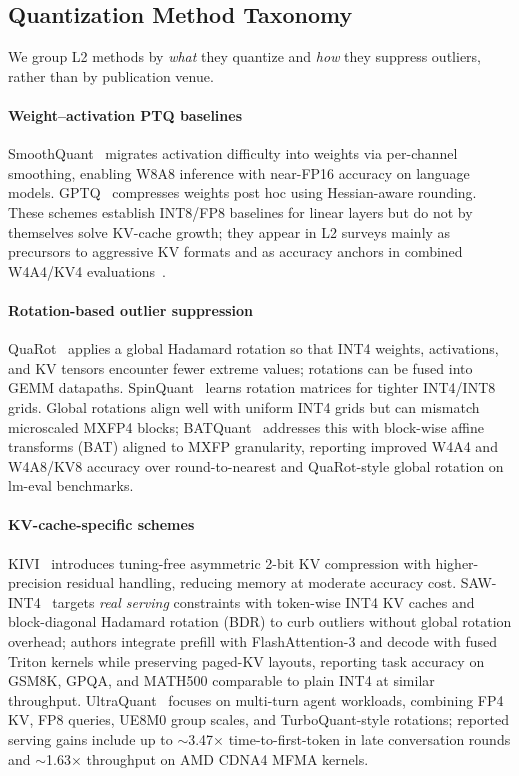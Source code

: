 \documentclass[conference]{IEEEtran}
\begin{document}
\subsection{Quantization Method Taxonomy}
\label{sec:l2-taxonomy}

We group L2 methods by \emph{what} they quantize and \emph{how} they suppress outliers, rather than by publication venue.

\paragraph{Weight--activation PTQ baselines}
SmoothQuant~\cite{xiao2023smoothquant} migrates activation difficulty into weights via per-channel smoothing, enabling W8A8 inference with near-FP16 accuracy on language models.
GPTQ~\cite{frantar2023gptq} compresses weights post hoc using Hessian-aware rounding.
These schemes establish INT8/FP8 baselines for linear layers but do not by themselves solve KV-cache growth; they appear in L2 surveys mainly as precursors to aggressive KV formats and as accuracy anchors in combined W4A4/KV4 evaluations~\cite{batquant2026}.

\paragraph{Rotation-based outlier suppression}
QuaRot~\cite{ashkboos2024quarot} applies a global Hadamard rotation so that INT4 weights, activations, and KV tensors encounter fewer extreme values; rotations can be fused into GEMM datapaths.
SpinQuant~\cite{liu2024spinquant} learns rotation matrices for tighter INT4/INT8 grids.
Global rotations align well with uniform INT4 grids but can mismatch microscaled MXFP4 blocks; BATQuant~\cite{batquant2026} addresses this with block-wise affine transforms (BAT) aligned to MXFP granularity, reporting improved W4A4 and W4A8/KV8 accuracy over round-to-nearest and QuaRot-style global rotation on lm-eval benchmarks.

\paragraph{KV-cache-specific schemes}
KIVI~\cite{liu2024kivi} introduces tuning-free asymmetric 2-bit KV compression with higher-precision residual handling, reducing memory at moderate accuracy cost.
SAW-INT4~\cite{sawint42026} targets \emph{real serving} constraints with token-wise INT4 KV caches and block-diagonal Hadamard rotation (BDR) to curb outliers without global rotation overhead; authors integrate prefill with FlashAttention-3 and decode with fused Triton kernels while preserving paged-KV layouts, reporting task accuracy on GSM8K, GPQA, and MATH500 comparable to plain INT4 at similar throughput.
UltraQuant~\cite{ultraquant2026} focuses on multi-turn agent workloads, combining FP4 KV, FP8 queries, UE8M0 group scales, and TurboQuant-style rotations; reported serving gains include up to $\sim$3.47$\times$ time-to-first-token in late conversation rounds and $\sim$1.63$\times$ throughput on AMD CDNA4 MFMA kernels.
\end{document}
